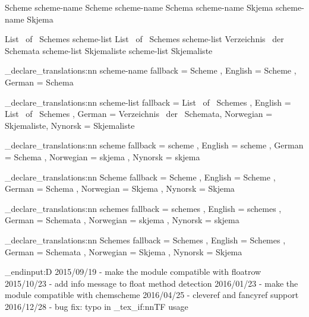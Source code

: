  {Scheme}
   {scheme-name} {Scheme}
    {scheme-name} {Schema}
 {scheme-name} {Skjema}
   {scheme-name} {Skjema}

 {List~ of~ Schemes}
    {scheme-list} {List~ of~ Schemes}
     {scheme-list} {Verzeichnis~ der~ Schemata}
  {scheme-list} {Skjemaliste}
    {scheme-list} {Skjemaliste}
\EndChemCompatibility

\chemmacros_declare_translations:nn {scheme-name}
  {
    fallback = Scheme ,
    English  = Scheme ,
    German   = Schema
  }

\chemmacros_declare_translations:nn {scheme-list}
  {
    fallback    = List~ of~ Schemes ,
    English     = List~ of~ Schemes ,
    German      = Verzeichnis~ der~ Schemata,
    Norwegian   = Skjemaliste,
    Nynorsk     = Skjemaliste
  }

\chemmacros_declare_translations:nn {scheme}
  {
    fallback  = scheme ,
    English   = scheme ,
    German    = Schema ,
    Norwegian = skjema ,
    Nynorsk   = skjema
  }

\chemmacros_declare_translations:nn {Scheme}
  {
    fallback  = Scheme ,
    English   = Scheme ,
    German    = Schema ,
    Norwegian = Skjema ,
    Nynorsk   = Skjema
  }

\chemmacros_declare_translations:nn {schemes}
  {
    fallback = schemes ,
    English  = schemes ,
    German   = Schemata ,
    Norwegian = skjema ,
    Nynorsk   = skjema
  }

\chemmacros_declare_translations:nn {Schemes}
  {
    fallback = Schemes ,
    English  = Schemes ,
    German   = Schemata ,
    Norwegian = Skjema ,
	Nynorsk   = Skjema
  }
\EndChemCompatibility

\tex_endinput:D
2015/09/19 - make the module compatible with floatrow
2015/10/23 - add info message to float method detection
2016/01/23 - make the module compatible with chemscheme
2016/04/25 - cleveref and fancyref support
2016/12/28 - bug fix: typo in \chemmacros_tex_if:nnTF usage
